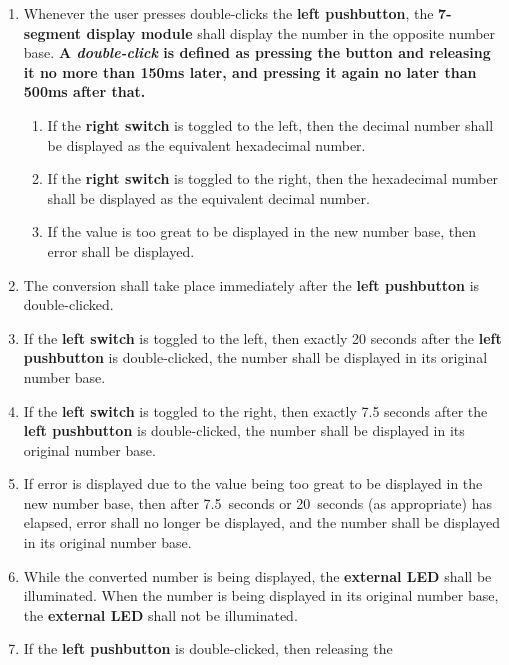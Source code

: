 \begin{enumerate}
\begin{enumerate}
    \item Whenever the user presses double-clicks the \textbf{left pushbutton},
        the \textbf{7-segment display module} shall display the number in the
        opposite number base. \textbf{A \textit{double-click} is defined as
        pressing the button and releasing it no more than 150ms later, and
        pressing it again no later than 500ms after that.}
        \begin{enumerate}
            \item If the \textbf{right switch} is toggled to the left, then the
                decimal number shall be displayed as the equivalent hexadecimal
                number.
            \item If the \textbf{right switch} is toggled to the right, then the
                hexadecimal number shall be displayed as the equivalent decimal
                number.
            \item If the value is too great to be displayed in the new number
                base, then {\dviiseg error} shall be displayed.
        \end{enumerate}
    \item The conversion shall take place immediately after the
        \textbf{left pushbutton} is double-clicked.
    \item If the \textbf{left switch} is toggled to the left, then exactly 20
        seconds after the \textbf{left pushbutton} is double-clicked, the number
        shall be displayed in its original number base.
    \item If the \textbf{left switch} is toggled to the right, then exactly 7.5
        seconds after the \textbf{left pushbutton} is double-clicked, the number
        shall be displayed in its original number base.
    \item If {\dviiseg error} is displayed due to the value being too great to
        be displayed in the new number base, then after 7.5~seconds or
        20~seconds (as appropriate) has elapsed, {\dviiseg error} shall no
        longer be displayed, and the number shall be displayed in its original
        number base.
    \item While the converted number is being displayed, the \textbf{external
        LED} shall be illuminated. When the number is being displayed in its
        original number base, the \textbf{external LED} shall not be
        illuminated.
    \item If the \textbf{left pushbutton} is double-clicked, then releasing the

\end{enumerate}
\end{enumerate}
